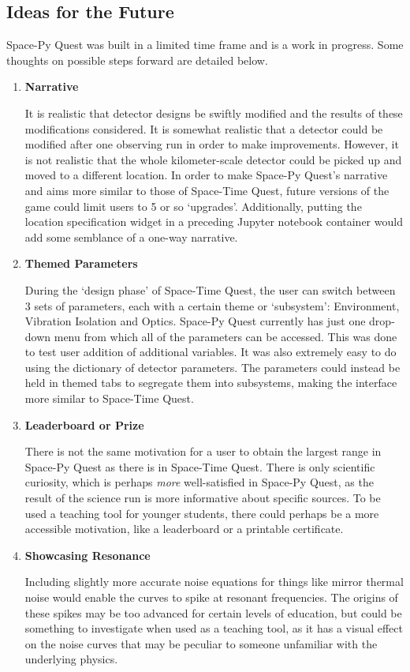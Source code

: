 \documentclass{article}
\begin{document}
\subsection{Ideas for the Future}
\label{sec:discussion}
Space-Py Quest was built in a limited time frame and is a work in progress. Some thoughts on possible steps forward are detailed below.
\begin{enumerate}
\item \textbf{Narrative}\par
It is realistic that detector designs be swiftly modified and the results of these modifications considered. It is somewhat realistic that a detector could be modified after one observing run in order to make improvements. However, it is not realistic that the whole kilometer-scale detector could be picked up and moved to a different location. In order to make Space-Py Quest's narrative and aims more similar to those of Space-Time Quest, future versions of the game could limit users to 5 or so `upgrades'. Additionally, putting the location specification widget in a preceding Jupyter notebook container would add some semblance of a one-way narrative. 
\item \textbf{Themed Parameters} \par
    During the `design phase' of Space-Time Quest, the user can switch between 3 sets of parameters, each with a certain theme or `subsystem': Environment, Vibration Isolation and Optics. Space-Py Quest currently has just one drop-down menu from which all of the parameters can be accessed. This was done to test user addition of additional variables. It was also extremely easy to do using the dictionary of detector parameters. The parameters could instead be held in themed tabs to segregate them into subsystems, making the interface more similar to Space-Time Quest. 
        \item \textbf{Leaderboard or Prize} \par
    There is not the same motivation for a user to obtain the largest range in Space-Py Quest as there is in Space-Time Quest. There is only scientific curiosity, which is perhaps \textit{more} well-satisfied in Space-Py Quest, as the result of the science run is more informative about specific sources. To be used a teaching tool for younger students, there could perhaps be a more accessible motivation, like a leaderboard or a printable certificate.
\item \textbf{Showcasing Resonance} \par
Including slightly more accurate noise equations for things like mirror thermal noise would enable the curves to spike at resonant frequencies. The origins of these spikes may be  too advanced for certain levels of education, but could be something to investigate when used as a teaching tool, as it has a visual effect on the noise curves that may be peculiar to someone unfamiliar with the underlying physics.

\end{enumerate}
\end{document}
